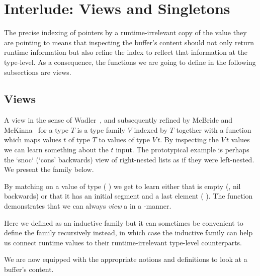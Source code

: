 
\section{Interlude: Views and Singletons}\label{sec:view}

The precise indexing of pointers by a runtime-irrelevant copy of the value
they are pointing to means that inspecting the buffer's content should
not only return runtime information but also refine the index to reflect
that information at the type-level.
%
As a consequence, the functions we are going to define in the following
subsections are views.

\subsection{Views}

A view
in the sense of Wadler~\citep{DBLP:conf/popl/Wadler87},
and subsequently refined by McBride and McKinna~\citep{DBLP:journals/jfp/McBrideM04}
for a type $T$ is a type family $V$ indexed by $T$ together
with a function which maps values $t$ of type $T$ to values of type
$V\,t$.
%
By inspecting the $V\,t$ values we can learn something about the
$t$ input.
%
The prototypical example is perhaps the `snoc` (`cons' backwards) view
of right-nested lists as if they were left-nested.
We present the  family below.


By matching on a value of type
( ) we get to learn
either that  is empty (, nil backwards)
or that it has an initial segment  and a last element
 ( \IdrisData{:<} ).
%
The function  demonstrates that we can always
\emph{view} a  in a -manner.


Here we defined  as an inductive family but it can
sometimes be convenient to define the family recursively instead,
in which case the  inductive family can
help us connect runtime values to their
runtime-irrelevant type-level counterparts.



We are now equipped with the appropriate notions and definitions to
look at a buffer's content.
